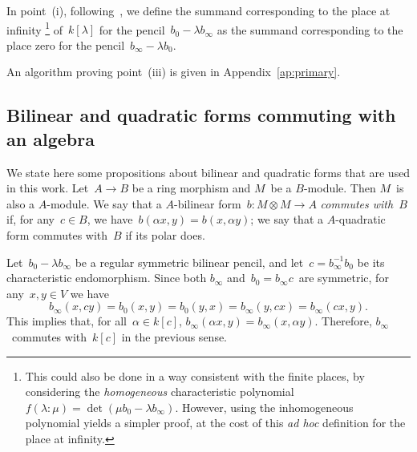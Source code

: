 \documentclass{amsart}
\begin{document}
In point~(i), following~\cite[§~4]{inventiones1976waterhouse},
we define the summand corresponding to the place at infinity%
\footnote{This could also be done in a way consistent with the finite places,
by considering the \emph{homogeneous} characteristic polynomial
$f(λ: μ) = \det (μ b_0 - λ b_∞)$.
However, using the inhomogeneous polynomial yields a simpler proof,
at the cost of this \emph{ad hoc} definition for the place at infinity.}
of~$k[λ]$ for the pencil~$b_0 - λ b_∞$ as the summand corresponding to
the place zero for the pencil~$b_∞ - λ b_0$.

An algorithm proving point~(iii)
is given in Appendix~\ref{ap:primary}.

\subsection{Bilinear and quadratic forms commuting with an algebra}
\label{ss:commute}
We state here some propositions about bilinear and quadratic forms
that are used in this work.
Let~$A → B$ be a ring morphism and $M$~be a $B$-module.
Then $M$~is also a $A$-module.
We say that a $A$-bilinear form~$b: M ⊗ M → A$ \emph{commutes with~$B$}
if, for any~$c ∈ B$, we have~$b(α x, y) = b(x, α y)$;
we say that a $A$-quadratic form commutes with~$B$ if its polar does.

Let~$b_0 - λ b_∞$ be a regular symmetric bilinear pencil,
and let~$c = b_∞^{-1} b_0$ be its characteristic endomorphism.
Since both $b_∞$ and~$b_0=b_∞ c$~are symmetric, for any~$x, y ∈ V$ we have
\begin{equation}
b_∞(x, c y) = b_0(x, y) = b_0(y, x) = b_∞(y, c x) = b_∞(c x, y).
\end{equation}
This implies that, for all~$α ∈ k[c]$, $b_∞(α x, y) = b_∞(x, α y)$.
Therefore, $b_∞$~commutes with~$k[c]$ in the previous sense.
\end{document}
